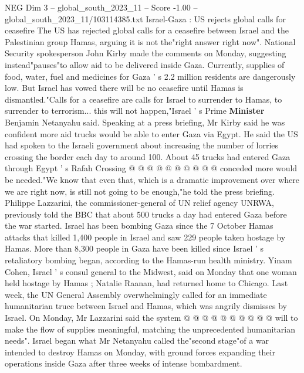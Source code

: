 \begin{textsample}{NEG Dim 3 – global\_south\_2023\_11 – Score -1.00 – global\_south\_2023\_11/103114385.txt}  \label{ex:f3_neg_110}
Israel-Gaza : US rejects global calls for ceasefire The US has rejected global calls for a ceasefire between Israel and the Palestinian group Hamas, arguing it is not the"right answer right now".
National Security spokesperson John Kirby made the comments on Monday, suggesting instead"pauses"to allow aid to be delivered inside Gaza.
Currently, supplies of food, water, fuel and medicines for Gaza ' s 2.2 million residents are dangerously low.
But Israel has vowed there will be no ceasefire until Hamas is dismantled."Calls for a ceasefire are calls for Israel to surrender to Hamas, to surrender to terrorism... this will not happen,"Israel ' s Prime \textbf{Minister} Benjamin Netanyahu said.
Speaking at a press briefing, Mr Kirby said he was confident more aid trucks would be able to enter Gaza via Egypt.
He said the US had spoken to the Israeli government about increasing the number of lorries crossing the border each day to around 100.
About 45 trucks had entered Gaza through Egypt ' s Rafah Crossing @ @ @ @ @ @ @ @ @ @ conceded more would be needed."We know that even that, which is a dramatic improvement over where we are right now, is still not going to be enough,"he told the press briefing.
Philippe Lazzarini, the commissioner-general of UN relief agency UNRWA, previously told the BBC that about 500 trucks a day had entered Gaza before the war started.
Israel has been bombing Gaza since the 7 October Hamas attacks that killed 1,400 people in Israel and saw 229 people taken hostage by Hamas.
More than 8,300 people in Gaza have been killed since Israel ' s retaliatory bombing began, according to the Hamas-run health ministry.
Yinam Cohen, Israel ' s consul general to the Midwest, said on Monday that one woman held hostage by Hamas ; Natalie Raanan, had returned home to Chicago.
Last week, the UN General Assembly overwhelmingly called for an immediate humanitarian truce between Israel and Hamas, which was angrily dismisses by Israel.
On Monday, Mr Lazzarini said the system @ @ @ @ @ @ @ @ @ @ will to make the flow of supplies meaningful, matching the unprecedented humanitarian needs".
Israel began what Mr Netanyahu called the"second stage"of a war intended to destroy Hamas on Monday, with ground forces expanding their operations inside Gaza after three weeks of intense bombardment.

\end{textsample}
